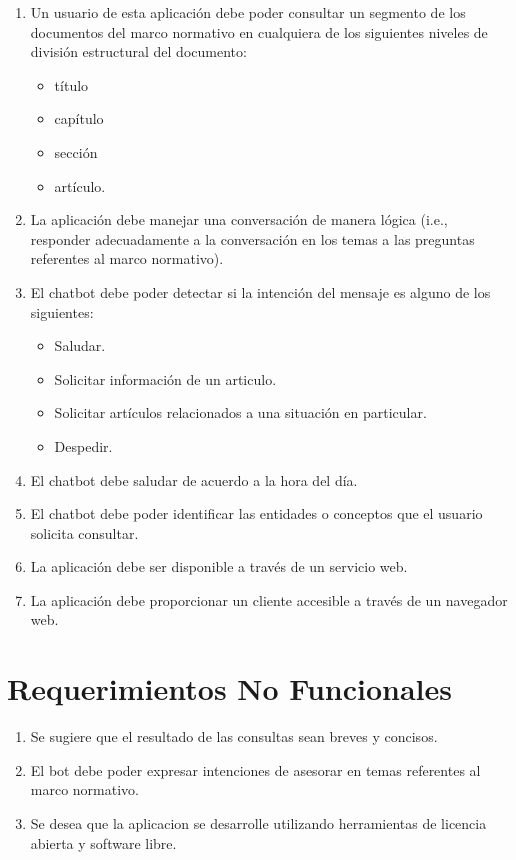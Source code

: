 \begin{enumerate}[leftmargin=2.5cm ,label={\bfseries RF-\arabic*}]
    \item \label{itm:consultar-reglamento} Un usuario de esta aplicación debe poder consultar un segmento de los documentos del marco normativo en cualquiera de los siguientes niveles de división estructural del documento:
    \begin{itemize}
        \item título
        \item capítulo
        \item sección
        \item artículo.
    \end{itemize}
    
    \item La aplicación debe manejar una conversación de manera lógica (i.e., responder adecuadamente a la conversación en los temas a las preguntas referentes al marco normativo).
    \item \label{itm:requisito-intenciones} El chatbot debe poder detectar si la intención del mensaje es alguno de los siguientes:
        \begin{itemize}
            \item Saludar.
            \item Solicitar información de un articulo.
            \item Solicitar artículos relacionados a una situación en particular.
            \item Despedir.
        \end{itemize}
    \item El chatbot debe saludar de acuerdo a la hora del día.
    \item El chatbot debe poder identificar las entidades o conceptos que el usuario solicita consultar.
    \item \label{itm:rf-servicio-web} La aplicación debe ser disponible a través de un servicio web.
    \item  \label{itm:cliente-web} La aplicación debe proporcionar un cliente accesible a través de un navegador web.
\end{enumerate}

\section{Requerimientos No Funcionales}

\begin{enumerate}[leftmargin=2.5cm ,label={\bfseries RNF-\arabic*}]
    \item Se sugiere que el resultado de las consultas sean breves y concisos. 
    \item El bot debe poder expresar intenciones de asesorar en temas referentes al marco normativo.
    \item Se desea que la aplicacion se desarrolle utilizando herramientas de licencia abierta y software libre.
\end{enumerate}

